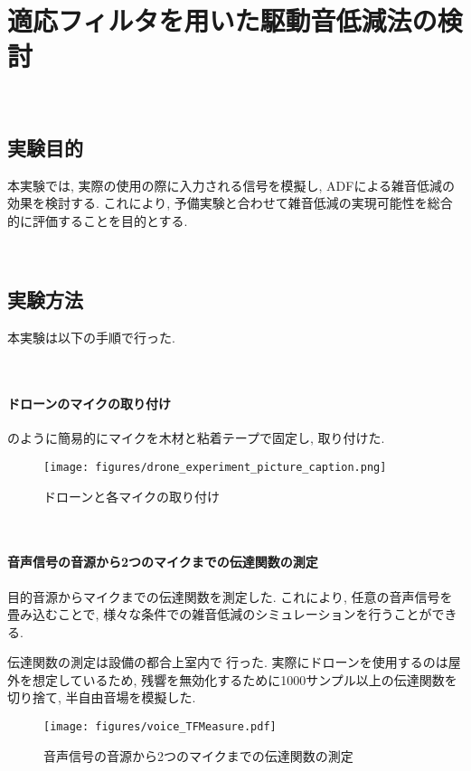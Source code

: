 \
\chapter{適応フィルタを用いた駆動音低減法の検討}\label{adf-practice}

\
\section{実験目的}\label{purpose-practice}

本実験では, 実際の使用の際に入力される信号を模擬し, ADFによる雑音低減の効果を検討する. 
これにより, 予備実験と合わせて雑音低減の実現可能性を総合的に評価することを目的とする. 

\
\section{実験方法}\label{instruction-practice}

本実験は以下の手順で行った. 

\
\subsubsection{ドローンのマイクの取り付け}\label{installment-mic}

のように簡易的にマイクを木材と粘着テープで固定し, 取り付けた. 

\begin{figure}[H]
\centering
\texttt{[image: figures/drone\_experiment\_picture\_caption.png]}
\caption{ドローンと各マイクの取り付け}
\label{fig:drone_experiment}
\end{figure}

\
\subsubsection{音声信号の音源から2つのマイクまでの伝達関数の測定}\label{observation-tf}

目的音源からマイクまでの伝達関数を測定した. これにより, 任意の音声信号を畳み込むことで, 様々な条件での雑音低減のシミュレーションを行うことができる. 

伝達関数の測定は設備の都合上室内で行った. 実際にドローンを使用するのは屋外を想定しているため, 残響を無効化するために1000サンプル以上の伝達関数を切り捨て, 半自由音場を模擬した. 

\begin{figure}[H]
\centering
\texttt{[image: figures/voice\_TFMeasure.pdf]}
\caption{音声信号の音源から2つのマイクまでの伝達関数の測定}
\end{figure}

